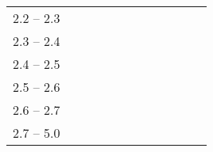 {{\begin{tabular}{|c|c|c|c|c|c|c|c|c|c|c|c|}
            \cline{1-1}
            2.2 -- 2.3               &                                      &                                        &                                   &                                  &                 &                  &                   &                  &                    &                   & \\   
            \cline{1-1}
            2.3 -- 2.4               &                                      &                                        &                                   &                                  &                 &                  &                   &                  &                    &                   & \\   
            \cline{1-1}
            2.4 -- 2.5               &                                      &                                        &                                   &                                  &                 &                  &                   &                  &                    &                   & \\   
            \cline{1-1}
            2.5 -- 2.6               &                                      &                                        &                                   &                                  &                 &                  &                   &                  &                    &                   & \\   
            \cline{1-1}
            2.6 -- 2.7               &                                      &                                        &                                   &                                  &                 &                  &                   &                  &                    &                   & \\   
            \cline{1-1}
            2.7 -- 5.0               &                                      &                                        &                                   &                                  &                 &                  &                   &                  &                    &                   & \\   
            \hline
        \end{tabular}
    }
}
